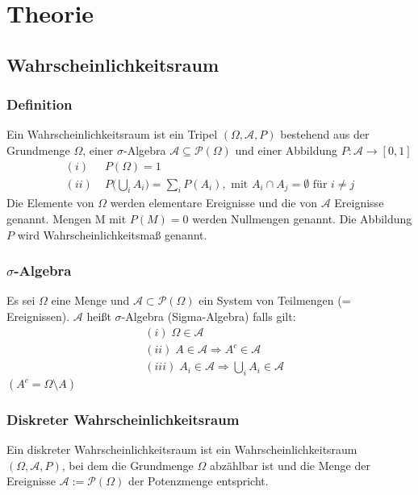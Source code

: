 \documentclass[a4paper]{article}
\begin{document}
\section{Theorie}
\setlength{\parindent}{0em}

\subsection{Wahrscheinlichkeitsraum}

\subsubsection{Definition}
Ein Wahrscheinlichkeitsraum ist ein Tripel $(\Omega, \mathcal{A}, P)$ bestehend aus der Grundmenge $\Omega$, einer $\sigma$-Algebra $\mathcal{A} \subseteq  \mathcal{P}(\Omega)$ und einer Abbildung
$P : \mathcal{A} \to [0,1]$
\begin{align*}
(i) & \; P(\Omega) = 1 \\
(ii) & \;  P \biggl(  \bigcup_i A_i  \biggr) = \sum_i P(A_i), \text{ mit } A_i \cap A_j = \emptyset \text{ für } i \neq j
\end{align*}
Die Elemente von $\Omega$ werden elementare Ereignisse und die von $\mathcal{A}$ Ereignisse genannt. Mengen M mit $P(M) = 0$ werden Nullmengen genannt.
Die Abbildung $P$ wird Wahrscheinlichkeitsmaß genannt.

\subsubsection{$\sigma$-Algebra}
Es sei $\Omega$ eine Menge und $\mathcal{A} \subset  \mathcal{P}(\Omega)$ ein System von Teilmengen (= Ereignissen). $\mathcal{A}$ heißt $\sigma$-Algebra (Sigma-Algebra) falls gilt:
\begin{align*}
& (i) \; \Omega \in \mathcal{A} \\
& (ii) \; A \in \mathcal{A} \Rightarrow A^c \in \mathcal{A} \\
& (iii) \; A_i \in \mathcal{A} \Rightarrow \bigcup_i A_i \in \mathcal{A} 
\end{align*}
$(A^c = \Omega \setminus A)$

\subsubsection{Diskreter Wahrscheinlichkeitsraum}
Ein diskreter Wahrscheinlichkeitsraum ist ein Wahrscheinlichkeitsraum $(\Omega, \mathcal{A}, P)$, bei dem die Grundmenge $\Omega$ abzählbar ist und die Menge der Ereignisse $\mathcal{A} := \mathcal{P}(\Omega)$ der Potenzmenge entspricht.
\end{document}
